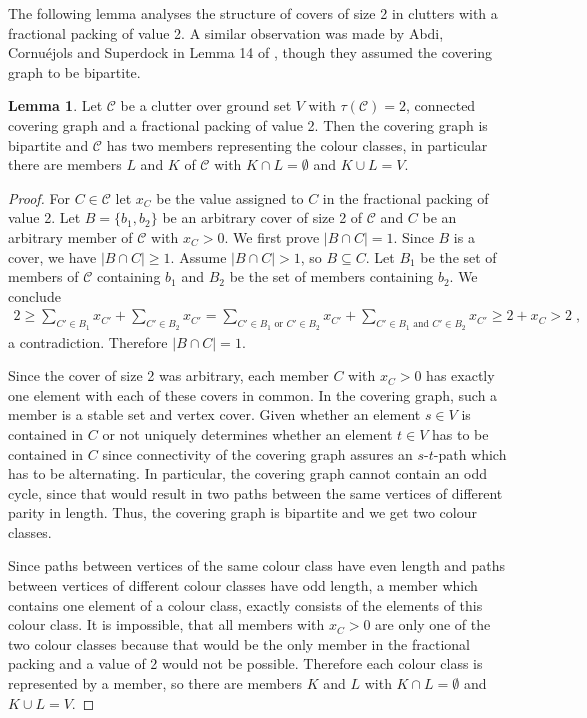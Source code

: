 \documentclass[a4paper, 12pt]{scrbook}
\theoremstyle{definition}
\newtheorem{lemma}[theorem]{Lemma}
\begin{document}
    The following lemma analyses the structure of covers of size 2 in clutters with a fractional packing of value 2. A similar observation was made by Abdi, Cornuéjols and Superdock in Lemma 14 of \cite{lemma}, though they assumed the covering graph to be bipartite.

   \begin{lemma}\label{bipartite}
       Let $\mathcal{C}$ be a clutter over ground set $V$ with $\tau(\mathcal{C})=2$, connected covering graph and a fractional packing of value 2.
       Then the covering graph is bipartite and $\mathcal{C}$ has two members representing the colour classes, in particular there are members $L$ and $K$ of $\mathcal{C}$ with $K \cap L = \emptyset$ and $K \cup L = V$.
   \end{lemma}

   \begin{proof}
       For $C \in \mathcal{C}$ let $x_C$ be the value assigned to $C$ in the fractional packing of value 2.
       Let $B=\{b_1,b_2\}$ be an arbitrary cover of size 2 of $\mathcal{C}$ and $C$ be an arbitrary member of $\mathcal{C}$ with $x_{C} > 0$.
       We first prove $|B\cap C| = 1$.
       Since $B$ is a cover, we have $|B\cap C| \geq 1$.
       Assume $|B \cap C| > 1$, so $B \subseteq C$.
       Let $B_1$ be the set of members of $\mathcal{C}$ containing $b_1$ and $B_2$ be the set of members containing $b_2$.
       We conclude
       \begin{align*}
           2 \geq \sum_{C'\in B_1} x_{C'} + \sum_{C' \in B_2} x_{C'} = \sum_{C' \in B_1 \text{ or } C' \in B_2} x_{C'} + \sum_{C' \in B_1 \text{ and } C' \in B_2} x_{C'} \geq 2 + x_C > 2 \;,
       \end{align*}
       a contradiction. Therefore $|B\cap C| = 1$.

       Since the cover of size 2 was arbitrary, each member $C$ with $x_C>0$ has exactly one element with each of these covers in common.
       In the covering graph, such a member is a stable set and vertex cover.
       Given whether an element $s \in V$ is contained in $C$ or not uniquely determines whether an element $t \in V$ has to be contained in $C$ since connectivity of the covering graph assures an $s$-$t$-path which has to be alternating.
       In particular, the covering graph cannot contain an odd cycle, since that would result in two paths between the same vertices of different parity in length. Thus, the covering graph is bipartite and we get two colour classes.

       Since paths between vertices of the same colour class have even length and paths between vertices of different colour classes have odd length, a member which contains one element of a colour class, exactly consists of the elements of this colour class.
       It is impossible, that all members with $x_C > 0$ are only one of the two colour classes because that would be the only member in the fractional packing and a value of 2 would not be possible.
       Therefore each colour class is represented by a member, so there are members $K$ and $L$ with $K \cap L = \emptyset$ and $K \cup L = V$.
   \end{proof}
\end{document}

